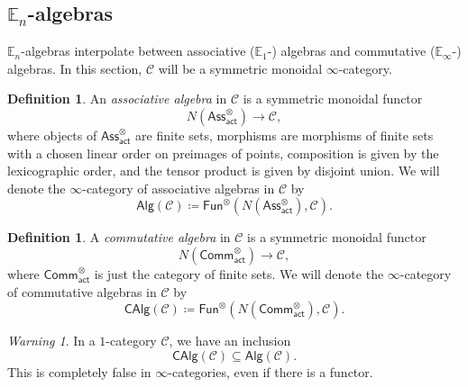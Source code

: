 \documentclass[10pt]{amsart}
\theoremstyle{definition}
\newtheorem{defn}[thm]{Definition}
\theoremstyle{remark}
\newtheorem{warn}[thm]{Warning}
\theoremstyle{plain}
\theoremstyle{definition}
\theoremstyle{remark}
\newcommand{\E}{\mathbb{E}}
\newcommand{\mc}[1]{\mathcal{#1}}
\newcommand{\ms}[1]{\mathsf{#1}}
\newcommand{\1}{\mathbf{1}}
\newcommand{\2}{\mathbf{2}}
\newcommand{\3}{\mathbf{3}}
\begin{document}
\subsection{$\E_n$-algebras}%
\label{sub:En-algebras}

$\E_n$-algebras interpolate between associative ($\E_1$-) algebras and commutative ($\E_{\infty}$-) algebras. In this section, $\mc{C}$ will be a symmetric monoidal $\infty$-category.

\begin{defn}
    An \textit{associative algebra} in $\mc{C}$ is a symmetric monoidal functor
    \[ N(\ms{Ass}_{\ms{act}}^{\otimes}) \to \mc{C}, \]
    where objects of $\ms{Ass}_{\ms{act}}^{\otimes}$ are finite sets, morphisms are morphisms of finite sets with a chosen linear order on preimages of points, composition is given by the lexicographic order, and the tensor product is given by disjoint union. We will denote the $\infty$-category of associative algebras in $\mc{C}$ by
    \[ \ms{Alg}(\mc{C}) \coloneqq \ms{Fun}^{\otimes}(N(\ms{Ass}_{\ms{act}}^{\otimes}), \mc{C}). \]
\end{defn}

\begin{defn}
    A \textit{commutative algebra} in $\mc{C}$ is a symmetric monoidal functor
    \[ N(\ms{Comm}_{\ms{act}}^{\otimes}) \to \mc{C}, \]
    where $\ms{Comm}_{\ms{act}}^{\otimes}$ is just the category of finite sets. We will denote the $\infty$-category of commutative algebras in $\mc{C}$ by
    \[ \ms{CAlg}(\mc{C}) \coloneqq \ms{Fun}^{\otimes}(N(\ms{Comm}_{\ms{act}}^{\otimes}), \mc{C}). \]
\end{defn}

\begin{warn}
    In a $1$-category $\mc{C}$, we have an inclusion
    \[ \ms{CAlg}(\mc{C}) \subseteq \ms{Alg}(\mc{C}). \]
    This is completely false in $\infty$-categories, even if there is a functor.
\end{warn}
\end{document}
